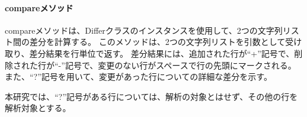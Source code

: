 \paragraph{compareメソッド}
compareメソッドは、Differクラスのインスタンスを使用して、2つの文字列リスト間の差分を計算する。
このメソッドは、2つの文字列リストを引数として受け取り、差分結果を行単位で返す。
差分結果には、追加された行が“+”記号で、削除された行が“-”記号で、変更のない行がスペースで行の先頭にマークされる。
また、“?”記号を用いて、変更があった行についての詳細な差分を示す。
\par
本研究では、“?”記号がある行については、解析の対象とはせず、その他の行を解析対象とする。


